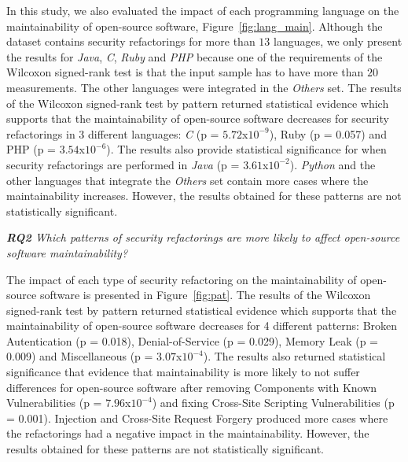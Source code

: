 \documentclass[10pt,conference]{IEEEtran}
\begin{document}
{In this study, we also evaluated the impact of each programming language on the
maintainability of open-source software, Figure~\ref{fig:lang_main}. Although the
dataset contains security refactorings for more than $13$ languages, we only
present the results for \emph{Java}, \emph{C}, \emph{Ruby} and \emph{PHP} because
one of the requirements of the Wilcoxon signed-rank test is that the input sample
has to have more than $20$ measurements. The other languages were integrated in the
\emph{Others} set. The results of the Wilcoxon signed-rank test by pattern returned
statistical evidence which supports that the maintainability of open-source software
decreases for security refactorings in 3 different languages: \emph{C}
(p = $5.72$x$10^{-9}$), Ruby (p = 0.057) and PHP (p = $3.54$x$10^{-6}$). The results
also provide statistical significance for when security refactorings are performed
in \emph{Java} (p = $3.61$x$10^{-2}$). \emph{Python} and the other languages
that integrate the \emph{Others} set contain more cases where the maintainability
increases. However, the results obtained for these patterns are not statistically
significant.



\begin{framed}
\textit{\textbf{RQ2} Which patterns of security refactorings are more likely to
affect open-source software maintainability?}
\end{framed}

The impact of each type of security refactoring on the maintainability of
open-source software is presented in Figure~\ref{fig:pat}. The results of the
Wilcoxon signed-rank test by pattern returned statistical evidence which
supports that the maintainability of open-source software decreases for 4
different patterns: Broken Autentication (p = 0.018), Denial-of-Service
(p = 0.029), Memory Leak (p = 0.009) and Miscellaneous (p = $3.07$x$10^{-4}$).
The results also returned statistical significance that evidence that maintainability
is more likely to not suffer differences for open-source software after removing
Components with Known Vulnerabilities (p = $7.96$x$10^{-4}$) and fixing Cross-Site
Scripting Vulnerabilities (p = 0.001). Injection and Cross-Site Request Forgery
produced more cases where the refactorings had a negative impact in the maintainability.
However, the results obtained for these patterns are not statistically significant.

}
\end{document}
